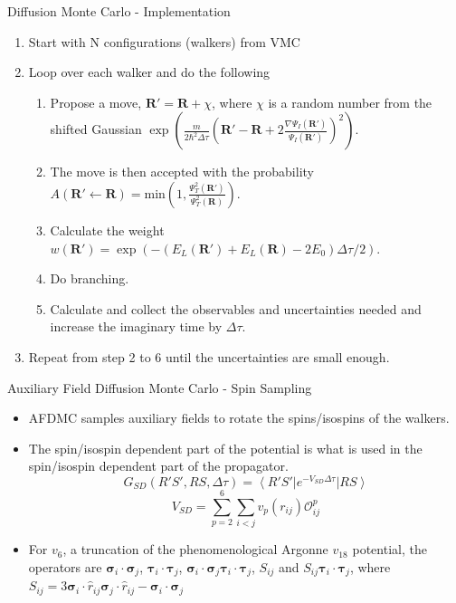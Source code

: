 \documentclass{beamer}
\newcommand{\ket}[1]{\left| #1 \right>}
\newcommand{\bra}[1]{\left< #1 \right|}
\newcommand{\Opij}{\mathcal{O}_{ij}^p}
\newcommand{\R}{\mathbf{R}}
\newcommand{\dt}{\Delta\tau}
\newcommand{\ti}{\bm{\tau}_i}
\newcommand{\tj}{\bm{\tau}_j}
\newcommand{\si}{\bm{\sigma}_i}
\newcommand{\sj}{\bm{\sigma}_j}
\begin{document}
\begin{frame}{Diffusion Monte Carlo - Implementation}
\begin{enumerate}
   \item Start with N configurations (walkers) from VMC
   \item Loop over each walker and do the following
   \begin{enumerate}
      \setlength\itemsep{0.2em}
      \item Propose a move, $\R' = \R + \chi$, where $\chi$ is a random number from the shifted Gaussian $\exp\left(\frac{m}{2\hbar^2\Delta\tau}\left(\R'-\R+2\frac{\nabla\Psi_I(\R')}{\Psi_I(\R')}\right)^2\right)$.
      \item The move is then accepted with the probability $A(\R'\leftarrow\R)=\mathrm{min}\left(1,\frac{\Psi_T^2(\R')}{\Psi_T^2(\R)}\right)$.
      \item Calculate the weight $w(\R')=\exp\left(-\left(E_L(\R')+E_L(\R)-2E_0\right)\Delta\tau/2\right)$.
      \item Do branching.
      \item Calculate and collect the observables and uncertainties needed and increase the imaginary time by $\Delta\tau$.
   \end{enumerate}
   \item Repeat from step 2 to 6 until the uncertainties are small enough.
\end{enumerate}
\end{frame}

\begin{frame}{Auxiliary Field Diffusion Monte Carlo - Spin Sampling}
\begin{itemize}
   \item AFDMC samples auxiliary fields to rotate the spins/isospins of the walkers.
   \item The spin/isospin dependent part of the potential is what is used in the spin/isospin dependent part of the propagator.
   \begin{equation*}
      G_{SD}(R'S',RS,\dt) = \bra {R'S'}e^{-V_{SD}\dt} \ket{RS}
   \end{equation*}
   \begin{equation*}
      V_{SD} = \sum\limits_{p=2}^6\sum\limits_{i<j}v_p(r_{ij})\Opij
   \end{equation*}
   \item For $v_6$, a truncation of the phenomenological Argonne $v_{18}$ potential, the operators are $\si\cdot\sj$, $\ti\cdot\tj$, $\si\cdot\sj \ti\cdot\tj$, $S_{ij}$ and $S_{ij} \ti\cdot\tj$, where $S_{ij} = 3\si\cdot\hat{r}_{ij}\sj\cdot\hat{r}_{ij}-\si\cdot\sj$
\end{itemize}
\end{frame}
\end{document}
